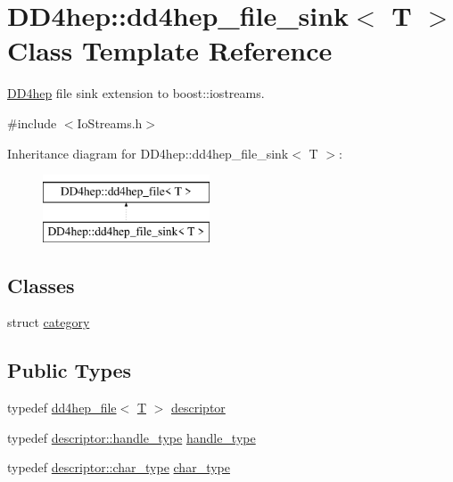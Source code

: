 \hypertarget{class_d_d4hep_1_1dd4hep__file__sink}{}\section{D\+D4hep\+:\+:dd4hep\+\_\+file\+\_\+sink$<$ T $>$ Class Template Reference}
\label{class_d_d4hep_1_1dd4hep__file__sink}


\hyperlink{namespace_d_d4hep}{D\+D4hep} file sink extension to boost\+::iostreams.  




{\ttfamily \#include $<$Io\+Streams.\+h$>$}

Inheritance diagram for D\+D4hep\+:\+:dd4hep\+\_\+file\+\_\+sink$<$ T $>$\+:\begin{figure}[H]
\begin{center}
\leavevmode
\includegraphics[height=2.000000cm]{class_d_d4hep_1_1dd4hep__file__sink}
\end{center}
\end{figure}
\subsection*{Classes}
\begin{DoxyCompactItemize}
\item 
struct \hyperlink{struct_d_d4hep_1_1dd4hep__file__sink_1_1category}{category}
\end{DoxyCompactItemize}
\subsection*{Public Types}
\begin{DoxyCompactItemize}
\item 
typedef \hyperlink{class_d_d4hep_1_1dd4hep__file}{dd4hep\+\_\+file}$<$ \hyperlink{class_t}{T} $>$ \hyperlink{class_d_d4hep_1_1dd4hep__file__sink_adf4c7b626a18fe2fdaf8a8fb6bf5ea3b}{descriptor}
\item 
typedef \hyperlink{class_d_d4hep_1_1dd4hep__file_a4d79f8d433cd7831ff818691424cd6fc}{descriptor\+::handle\+\_\+type} \hyperlink{class_d_d4hep_1_1dd4hep__file__sink_a660f6328d32832c96f2b59afb2164214}{handle\+\_\+type}
\item 
typedef \hyperlink{class_d_d4hep_1_1dd4hep__file_aef4242f7f2fe15a59f7bf7a8f6ba24d5}{descriptor\+::char\+\_\+type} \hyperlink{class_d_d4hep_1_1dd4hep__file__sink_a358c907508083da65c4cd31725331460}{char\+\_\+type}
\end{DoxyCompactItemize}
